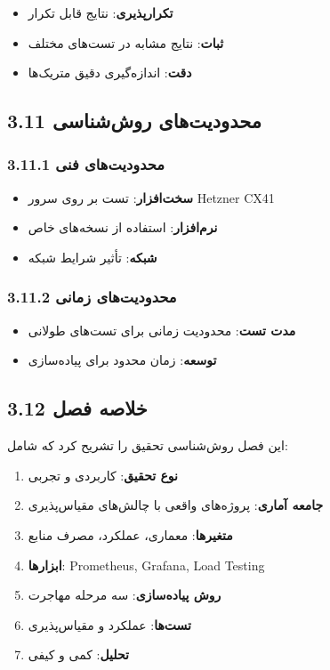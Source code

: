 \documentclass[
]{article}
\providecommand{\tightlist}{%
  \setlength{\itemsep}{0pt}\setlength{\parskip}{0pt}}
\begin{document}
\begin{itemize}
\tightlist
\item
  \textbf{تکرارپذیری}: نتایج قابل تکرار
\item
  \textbf{ثبات}: نتایج مشابه در تست‌های مختلف
\item
  \textbf{دقت}: اندازه‌گیری دقیق متریک‌ها
\end{itemize}

\subsection{3.11 محدودیت‌های
روش‌شناسی}\label{ux645ux62dux62fux648ux62fux6ccux62aux647ux627ux6cc-ux631ux648ux634ux634ux646ux627ux633ux6cc}

\subsubsection{3.11.1 محدودیت‌های
فنی}\label{ux645ux62dux62fux648ux62fux6ccux62aux647ux627ux6cc-ux641ux646ux6cc-1}

\begin{itemize}
\tightlist
\item
  \textbf{سخت‌افزار}: تست بر روی سرور Hetzner CX41
\item
  \textbf{نرم‌افزار}: استفاده از نسخه‌های خاص
\item
  \textbf{شبکه}: تأثیر شرایط شبکه
\end{itemize}

\subsubsection{3.11.2 محدودیت‌های
زمانی}\label{ux645ux62dux62fux648ux62fux6ccux62aux647ux627ux6cc-ux632ux645ux627ux646ux6cc-1}

\begin{itemize}
\tightlist
\item
  \textbf{مدت تست}: محدودیت زمانی برای تست‌های طولانی
\item
  \textbf{توسعه}: زمان محدود برای پیاده‌سازی
\end{itemize}

\subsection{3.12 خلاصه
فصل}\label{ux62eux644ux627ux635ux647-ux641ux635ux644-1}

این فصل روش‌شناسی تحقیق را تشریح کرد که شامل:

\begin{enumerate}
\def\labelenumi{\arabic{enumi}.}
\tightlist
\item
  \textbf{نوع تحقیق}: کاربردی و تجربی
\item
  \textbf{جامعه آماری}: پروژه‌های واقعی با چالش‌های مقیاس‌پذیری
\item
  \textbf{متغیرها}: معماری، عملکرد، مصرف منابع
\item
  \textbf{ابزارها}: Prometheus, Grafana, Load Testing
\item
  \textbf{روش پیاده‌سازی}: سه مرحله مهاجرت
\item
  \textbf{تست‌ها}: عملکرد و مقیاس‌پذیری
\item
  \textbf{تحلیل}: کمی و کیفی
\end{enumerate}
\end{document}

